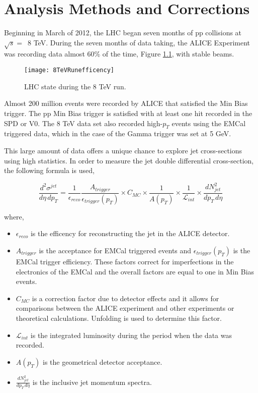 \chapter{Analysis Methods and Corrections} \label{ch:analysis}

Beginning in March of 2012, the LHC began seven months of pp collisions at $\sqrt{s} = \,$ 8 TeV. During the seven months of data taking, the ALICE Experiment was recording data almost 60\% of the time, Figure \ref{fig:RunEffer}, with stable beams.

\begin{figure}[h]
\texttt{[image: 8TeVRunefficency]}
\centering
\caption{LHC state during the 8 TeV run. }
\label{fig:RunEffer}
\end{figure}


Almost 200 million events were recorded by ALICE that satisfied the Min Bias trigger.  The pp Min Bias trigger is satisfied with at least one hit recorded in the SPD or V0.  The 8 TeV data set also recorded high-$p_{T}$ events using the EMCal triggered data, which in the case of the Gamma trigger was set at 5 GeV.  

This large amount of data offers a unique chance to explore jet cross-sections using high statistics.   In order to measure the jet double differential cross-section, the following formula is used,

\begin{equation}
	\frac{d^{2} \sigma^{jet}}{d\eta \, dp_{T}} = \frac{1}{\epsilon_{reco}} \frac{A_{trigger}}{\epsilon_{trigger}(p_{T})} \times C_{MC} \times \frac{1}{A(p_{T}) } \times \frac{1}{\mathscr{L}_{int}} \times \frac{dN^{2}_{jet}}{dp_{T} \, d\eta}
\label{eq:xsecdef}
\end{equation}

\noindent
where,

\begin{itemize}
  \item $\epsilon_{reco}$ is the efficency for reconstructing the jet in the ALICE detector.
  \item $A_{trigger}$ is the acceptance for EMCal triggered events and $\epsilon_{trigger}(p_{T})$ is the EMCal trigger efficiency.  These factors correct for imperfections in the electronics of the EMCal and the overall factors are equal to one in Min Bias events.
  \item $C_{MC}$ is a correction factor due to detector effects and it allows for comparisons between the ALICE experiment and other experiments or theoretical calculations.  Unfolding is used to determine this factor.
  \item $\mathscr{L}_{int}$ is the integrated luminosity during the period when the data was recorded.
  \item $A(p_{T})$ is the geometrical detector acceptance.
  \item $\frac{dN^{2}_{jet}}{dp_{T} \, d\eta}$ is the inclusive jet momentum spectra.
  
\end{itemize}

